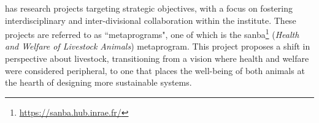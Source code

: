 \INRAE{} has research projects targeting strategic objectives, with a focus on fostering interdisciplinary and inter-divisional collaboration within the institute. These projects are referred to as ``metaprograms", one of which is the 
\gls{sanba}\footnote{\url{https://sanba.hub.inrae.fr/}} (\emph{Health and Welfare of Livestock Animals}) metaprogram. This project proposes a shift in perspective about livestock, transitioning from a vision where health and welfare were considered peripheral, to one that places the well-being of both animals at the hearth of designing more sustainable systems.


\fi